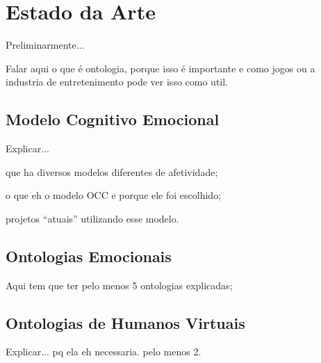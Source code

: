 \chapter{Estado da Arte} \label{cap:eda}

Preliminarmente...

Falar aqui o que é ontologia, porque isso é importante e como jogos ou a
industria de entretenimento pode ver isso como util.

\section{Modelo Cognitivo Emocional} \label{cap:eda:mce}

Explicar...

	que ha diversos modelos diferentes de afetividade;

	o que eh o modelo OCC e porque ele foi escolhido;

	projetos ``atuais'' utilizando esse modelo.

\section{Ontologias Emocionais} \label{cap:eda:oe}

Aqui tem que ter pelo menos 5 ontologias explicadas;


\section{Ontologias de Humanos Virtuais} \label{cap:eda:odhv}

Explicar...
	pq ela eh necessaria.
	pelo menos 2.
